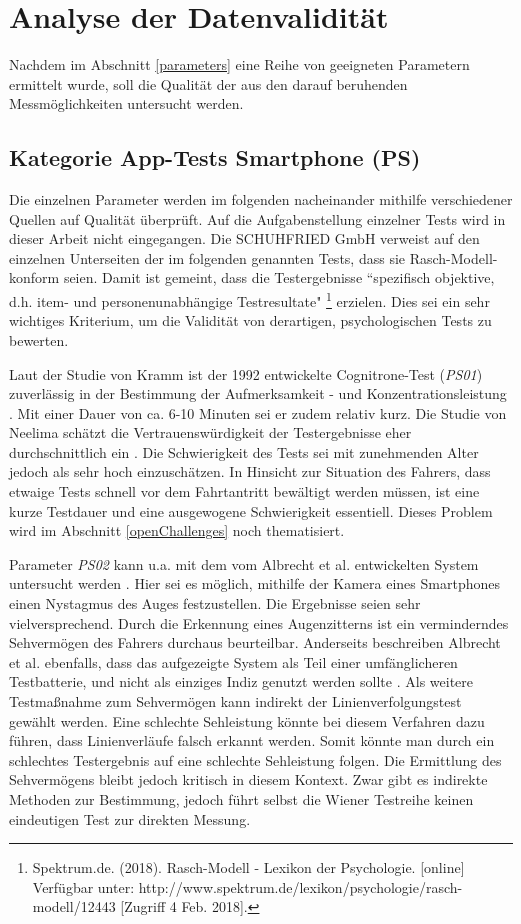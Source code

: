 \section{Analyse der Datenvalidität}
\label{dataValidity}
Nachdem im Abschnitt \ref{parameters} eine Reihe von geeigneten Parametern ermittelt wurde, soll die Qualität der aus den darauf beruhenden Messmöglichkeiten untersucht werden.

\subsection{Kategorie App-Tests Smartphone (PS)}

Die einzelnen Parameter werden im folgenden nacheinander mithilfe verschiedener Quellen auf Qualität überprüft. Auf die Aufgabenstellung einzelner Tests wird in dieser Arbeit nicht eingegangen. Die SCHUHFRIED GmbH verweist auf den einzelnen Unterseiten der im folgenden genannten Tests, dass sie Rasch-Modell-konform seien. Damit ist gemeint, dass die Testergebnisse ``spezifisch objektive, d.h. item- und personenunabhängige Testresultate" \footnote{Spektrum.de. (2018). Rasch-Modell - Lexikon der Psychologie. [online] Verfügbar unter: http://www.spektrum.de/lexikon/psychologie/rasch-modell/12443 [Zugriff 4 Feb. 2018].} erzielen. Dies sei ein sehr wichtiges Kriterium, um die Validität von derartigen, psychologischen Tests zu bewerten.

Laut der Studie von Kramm ist der 1992 entwickelte Cognitrone-Test (\textit{PS01}) zuverlässig in der Bestimmung der Aufmerksamkeit - und Konzentrationsleistung \cite{studieaufmerksamkeitstests}. Mit einer Dauer von ca. 6-10 Minuten sei er zudem relativ kurz. Die Studie von Neelima schätzt die Vertrauenswürdigkeit der Testergebnisse eher durchschnittlich ein \cite{indiaassessment}. Die Schwierigkeit des Tests sei mit zunehmenden Alter jedoch als sehr hoch einzuschätzen. In Hinsicht zur Situation des Fahrers, dass etwaige Tests schnell vor dem Fahrtantritt bewältigt werden müssen, ist eine kurze Testdauer und eine ausgewogene Schwierigkeit essentiell. Dieses Problem wird im Abschnitt \ref{openChallenges} noch thematisiert.

Parameter \textit{PS02} kann u.a. mit dem vom Albrecht et al. entwickelten System untersucht werden \cite{mobilesmarttracking}. Hier sei es möglich, mithilfe der Kamera eines Smartphones einen Nystagmus des Auges festzustellen. Die Ergebnisse seien sehr vielversprechend. Durch die Erkennung eines Augenzitterns ist ein verminderndes Sehvermögen des Fahrers durchaus beurteilbar. Anderseits beschreiben Albrecht et al. ebenfalls, dass das aufgezeigte System als Teil einer umfänglicheren Testbatterie, und nicht als einziges Indiz genutzt werden sollte \cite{mobilesmarttracking}. Als weitere Testmaßnahme zum Sehvermögen kann indirekt der Linienverfolgungstest gewählt werden. Eine schlechte Sehleistung könnte bei diesem Verfahren dazu führen, dass Linienverläufe falsch erkannt werden. Somit könnte man durch ein schlechtes Testergebnis auf eine schlechte Sehleistung folgen. Die Ermittlung des Sehvermögens bleibt jedoch kritisch in diesem Kontext. Zwar gibt es indirekte Methoden zur Bestimmung, jedoch führt selbst die Wiener Testreihe keinen eindeutigen Test zur direkten Messung.

